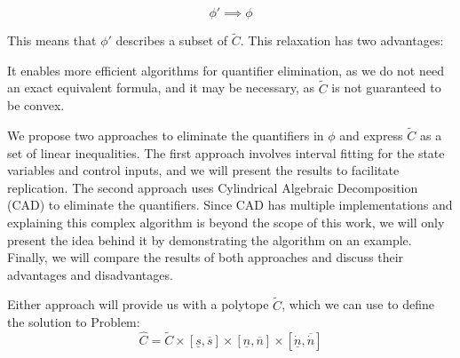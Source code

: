 \[ \phi'
	\implies \phi \]

This means that $\phi'$ describes a subset of $\tilde{C}$.
This relaxation has two advantages:

It enables more efficient algorithms for quantifier elimination, as we do not need an exact
equivalent formula, and it may be necessary, as $\tilde{C}$ is not guaranteed to be convex.

We propose two approaches to eliminate the quantifiers in $\phi$ and express $\tilde{C}$ as a set of linear inequalities.
The first approach involves interval fitting for the state variables and control inputs, and we will present the results to facilitate replication.
The second approach uses Cylindrical Algebraic Decomposition (CAD) to eliminate the quantifiers.
Since CAD has multiple implementations and explaining this complex algorithm is beyond the scope of this work, we will only present the idea behind
it by demonstrating the algorithm on an example.
Finally, we will compare the results of both approaches and discuss their advantages and disadvantages.

Either approach will provide us with a polytope $\tilde{C}$, which we can use to define the solution to Problem:
\begin{equation}
	\label{eq:pm_coupling_constraints}
	\hat{C} = \tilde{C} \times [\underline{s}, \overline{s}] \times [\underline{n}, \overline{n}] \times [\underline{\dot{n}}, \overline{\dot{n}}]
\end{equation}

